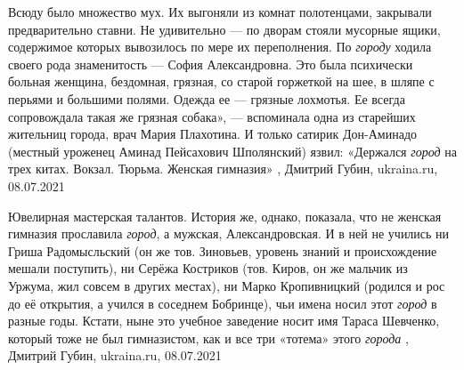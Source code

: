Всюду было множество мух. Их выгоняли из комнат полотенцами, закрывали
предварительно ставни. Не удивительно — по дворам стояли мусорные ящики,
содержимое которых вывозилось по мере их переполнения.  По \emph{городу} ходила своего
рода знаменитость — София Александровна. Это была психически больная женщина,
бездомная, грязная, со старой горжеткой на шее, в шляпе с перьями и большими
полями. Одежда ее — грязные лохмотья. Ее всегда сопровождала такая же грязная
собака», — вспоминала одна из старейших жительниц города, врач Мария Плахотина.
И только сатирик Дон-Аминадо (местный уроженец Аминад Пейсахович Шполянский)
язвил: «Держался \emph{город} на трех китах. Вокзал. Тюрьма. Женская гимназия»
, Дмитрий Губин, ukraina.ru, 08.07.2021

Ювелирная мастерская талантов.
История же, однако, показала, что не женская гимназия прославила \emph{город}, а
мужская, Александровская. И в ней не учились ни Гриша Радомысльский (он же тов.
Зиновьев, уровень знаний и происхождение мешали поступить), ни Серёжа Костриков
(тов. Киров, он же мальчик из Уржума, жил совсем в других местах), ни Марко
Кропивницкий (родился и рос до её открытия, а учился в соседнем Бобринце), чьи
имена носил этот \emph{город} в разные годы. Кстати, ныне это учебное заведение носит
имя Тараса Шевченко, который тоже не был гимназистом, как и все три «тотема»
этого \emph{города}
, Дмитрий Губин, ukraina.ru, 08.07.2021

